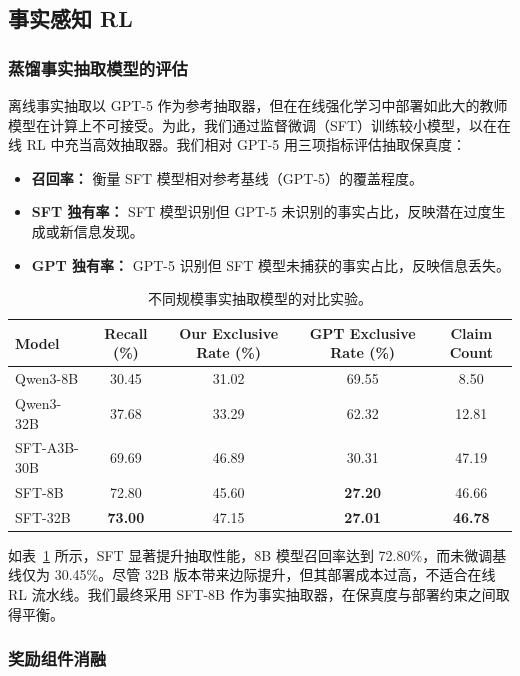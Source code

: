 \subsection{事实感知 RL} 
\subsubsection{蒸馏事实抽取模型的评估}
\label{sec:extraction_model_evaluation}

离线事实抽取以 GPT-5 作为参考抽取器，但在在线强化学习中部署如此大的教师模型在计算上不可接受。为此，我们通过监督微调（SFT）训练较小模型，以在在线 RL 中充当高效抽取器。我们相对 GPT-5 用三项指标评估抽取保真度：

\begin{itemize}
    \item \textbf{召回率：} 衡量 SFT 模型相对参考基线（GPT-5）的覆盖程度。
    \item \textbf{SFT 独有率：} SFT 模型识别但 GPT-5 未识别的事实占比，反映潜在过度生成或新信息发现。
    \item \textbf{GPT 独有率：} GPT-5 识别但 SFT 模型未捕获的事实占比，反映信息丢失。
\end{itemize}

\begin{table}[H]
\centering
\caption{不同规模事实抽取模型的对比实验。}
\label{tab:model_performance}
\begin{tabular}{lcccc}
\toprule
Model & Recall (\%) & Our Exclusive Rate (\%) & GPT Exclusive Rate (\%) & Claim Count \\
\midrule
Qwen3-8B & 30.45 & 31.02 & 69.55 & 8.50 \\
Qwen3-32B & 37.68 & 33.29 & 62.32 & 12.81 \\
SFT-A3B-30B & 69.69 & 46.89 & 30.31 & 47.19 \\
SFT-8B & 72.80 & 45.60 & \textbf{27.20} & 46.66 \\
SFT-32B & \textbf{73.00} & 47.15 & \textbf{27.01} & \textbf{46.78} \\
\bottomrule
\end{tabular}
\end{table}

如表~\ref{tab:model_performance} 所示，SFT 显著提升抽取性能，8B 模型召回率达到 72.80\%，而未微调基线仅为 30.45\%。尽管 32B 版本带来边际提升，但其部署成本过高，不适合在线 RL 流水线。我们最终采用 SFT-8B 作为事实抽取器，在保真度与部署约束之间取得平衡。

\subsubsection{奖励组件消融}
\label{sec:ablation_reward}

